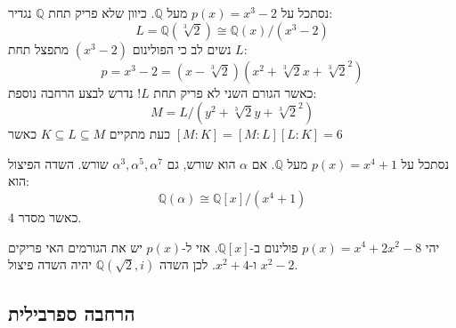 \documentclass{tstextbook}
\begin{document}
\begin{example}
נסתכל על \(p(x)=x^3 - 2\) מעל \(\mathbb{Q}\). כיוון שלא פריק תחת \(\mathbb{Q}\) נגדיר:
$$L=\mathbb{Q} \left( \sqrt[3]{ 2 } \right) \cong \mathbb{Q} (x) / (x^3 - 2)$$
נשים לב כי הפולינום \((x^3 - 2)\) מתפצל תחת \(L\):
$$p=x^3-2=\left( x-\sqrt[3]{ 2 } \right)\left( x^2+\sqrt[3]{ 2 } x+\sqrt[3]{ 2 }^2\right)$$
כאשר הגורם השני לא פריק תחת \(L\)! נדרש לבצע הרחבה נוספת:
$$M= L  /\left( y^2+\sqrt[3]{ 2 }y+\sqrt[3]{ 2 }^2 \right)$$
כעת מתקיים \(K\subseteq L \subseteq M\)
כאשר \([M:K]=[M:L][L:K]=6\)

\end{example}
\begin{example}
נסתכל על \(p(x)=x^4+1\) מעל \(\mathbb{Q}\). אם \(\alpha\) הוא שורש, גם \(\alpha^3,\alpha^5, \alpha^7\) שורש. השדה הפיצול הוא:
$$\mathbb{Q} \left( \alpha \right)\cong  \mathbb{Q} [x] / (x^4+1)$$
כאשר מסדר 4.

\end{example}
\begin{example}
יהי \(p(x)=x^4+2x^2-8\) פולינום ב-\(\mathbb{Q}[x]\). אזי ל-\(p(x)\) יש את הגורמים האי פריקים \(x^2-2\) ו-\(x^2+4\). לכן השדה \(\mathbb{Q}\left( \sqrt{ 2 },i \right)\) יהיה השדה פיצול.

\end{example}
\subsection{הרחבה ספרבילית}
\end{document}
